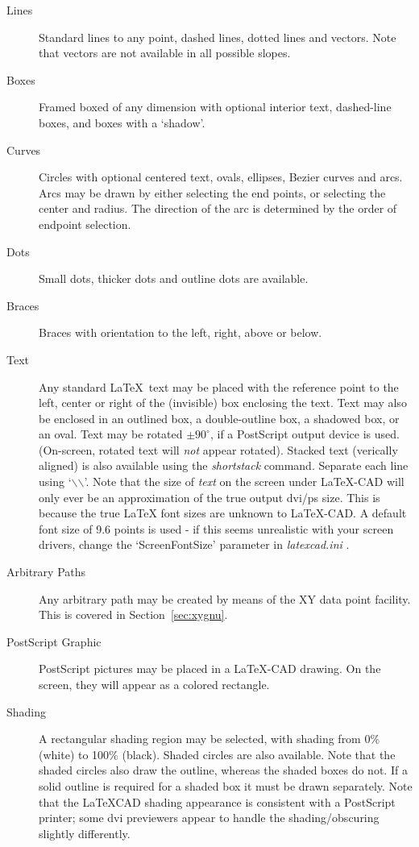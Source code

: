 \documentclass[a4paper]{article}
\newcommand{\bs}{$\backslash$}
\begin{document}
\begin{description}
	\item[Lines] Standard lines to any point, dashed lines,
			dotted lines and vectors. Note that
			vectors are not available in all possible
			slopes.
	\item[Boxes] Framed boxed of any dimension with optional
			interior text, dashed-line boxes, and
			boxes with a `shadow'.
	\item[Curves] Circles with optional centered text,
			ovals, ellipses, Bezier curves and arcs.
			Arcs may be drawn by either selecting the
			end points, or selecting the center and
			radius. The direction of the arc is determined
			by the order of endpoint selection.
	\item[Dots] Small dots, thicker dots and outline dots are available.
	\item[Braces] Braces with orientation to the left, right,
			above or below.
	\item[Text] Any standard \LaTeX\ text may be placed with the
			reference point to the left, center or
			right of the (invisible) box enclosing the
			text. Text may also be enclosed in an outlined box,
			a double-outline box, a shadowed box, or an oval.
			Text may be rotated $\pm 90^\circ $, if a
			PostScript output device is used.
			(On-screen, rotated text will \emph{not} appear rotated).
			Stacked text (verically aligned)
			is also available using the \textit{shortstack} command.
			Separate each line using `\bs\bs'. Note that the
			size of \textit{text} on the screen under LaTeX-CAD will only
			ever be an approximation of the true output dvi/ps
			size. This is because the true \LaTeX\/ font sizes are
			unknown to LaTeX-CAD. A default font size of 9.6 points
			is used - if this seems unrealistic with your screen
			drivers, change the `ScreenFontSize' parameter in
			\textit{latexcad.ini} .
			
	\item[Arbitrary Paths] Any arbitrary path may be created by
			means of the XY data point facility. This is
			covered in Section~\ref{sec:xygnu}.
	\item[PostScript Graphic] PostScript pictures may be placed in a
			\LaTeX-CAD drawing. On the screen, they will
			appear as a colored rectangle.
	\item[Shading] A rectangular shading region may be selected, with shading
			from 0\% (white) to 100\% (black). Shaded circles are also
			available. Note that the shaded circles also draw the
			outline, whereas the shaded boxes do not. If a solid outline
			is required for a shaded box it must be drawn separately.
			Note that the LaTeXCAD shading appearance is consistent
			with a PostScript printer; some \textsf{dvi} previewers
			appear to handle the shading/obscuring slightly differently.
\end{description}
\end{document}
